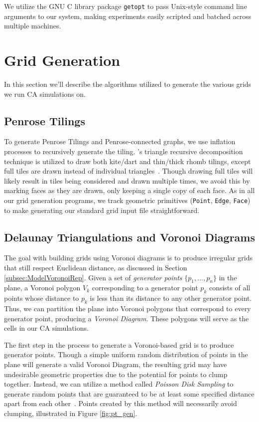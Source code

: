 \documentclass[a4paper,11pt]{report}
\begin{document}
We utilize the GNU C library package \texttt{getopt} to pass Unix-style command line arguments to our system, making experiments easily scripted and batched across multiple machines.

\section{Grid Generation}
\label{sec:GridGen}

In this section we'll describe the algorithms utilized to generate the various grids we run CA simulations on.

\subsection{Penrose Tilings}
To generate Penrose Tilings and Penrose-connected graphs, we use inflation processes to recursively generate the tiling. \citeauthor{ro71}'s triangle recursive decomposition technique is utilized to draw both kite/dart and thin/thick rhomb tilings, except full tiles are drawn instead of individual triangles~\cite{ro71}. Though drawing full tiles will likely result in tiles being considered and drawn multiple times, we avoid this by marking faces as they are drawn, only keeping a single copy of each face. As in all our grid generation programs, we track geometric primitives (\texttt{Point}, \texttt{Edge}, \texttt{Face}) to make generating our standard grid input file straightforward.


\subsection{Delaunay Triangulations and Voronoi Diagrams}
The goal with building grids using Voronoi diagrams is to produce irregular grids that still respect Euclidean distance, as discussed in Section \ref{subsec:ModelVoronoiRep}. Given a set of \textit{generator points} $\{p_1, ..., p_n\}$ in the plane, a Voronoi polygon $V_k$ corresponding to a generator point $p_k$ consists of all points whose distance to $p_k$ is less than its distance to any other generator point. Thus, we can partition the plane into Voronoi polygons that correspond to every generator point, producing a \textit{Voronoi Diagram}. These polygons will serve as the cells in our CA simulations. 

The first step in the process to generate a Voronoi-based grid is to produce generator points. Though a simple uniform random distribution of points in the plane will generate a valid Voronoi Diagram, the resulting grid may have undesirable geometric properties due to the potential for points to clump together. Instead, we can utilize a method called \textit{Poisson Disk Sampling} to generate random points that are guaranteed to be at least some specified distance apart from each other~\cite{br07}. Points created by this method will necessarily avoid clumping, illustrated in Figure \ref{fig:pt_gen}.
\end{document}
